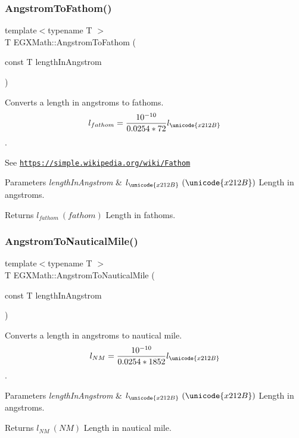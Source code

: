 \subsubsection{\texorpdfstring{Angstrom\+To\+Fathom()}{AngstromToFathom()}}
{\footnotesize\ttfamily template$<$typename T $>$ \\
T E\+G\+X\+Math\+::\+Angstrom\+To\+Fathom (\begin{DoxyParamCaption}\item[{const T}]{length\+In\+Angstrom }\end{DoxyParamCaption})}



Converts a length in angstroms to fathoms. \[ l_{fathom}= \frac{10^{-10}}{0.0254 * 72} l_{\unicode{x212B}} \]. 

See \href{https://simple.wikipedia.org/wiki/Fathom}{\tt https\+://simple.\+wikipedia.\+org/wiki/\+Fathom} 
\begin{DoxyParams}{Parameters}
{\em length\+In\+Angstrom} & $ l_{\unicode{x212B}}\ (\unicode{x212B})$ Length in angstroms. \\
\hline
\end{DoxyParams}
\begin{DoxyReturn}{Returns}
$ l_{fathom}\ (fathom)$ Length in fathoms. 
\end{DoxyReturn}
\mbox{\label{group___e_g_x_math-_conversions-_length_conversions-_non-_s_i-_angstrom-_nautical_ga4be465819cdcbfd7da046440844f5d82}} 
\subsubsection{\texorpdfstring{Angstrom\+To\+Nautical\+Mile()}{AngstromToNauticalMile()}}
{\footnotesize\ttfamily template$<$typename T $>$ \\
T E\+G\+X\+Math\+::\+Angstrom\+To\+Nautical\+Mile (\begin{DoxyParamCaption}\item[{const T}]{length\+In\+Angstrom }\end{DoxyParamCaption})}



Converts a length in angstroms to nautical mile. \[ l_{NM}= \frac{10^{-10}}{0.0254 * 1852} l_{\unicode{x212B}} \]. 


\begin{DoxyParams}{Parameters}
{\em length\+In\+Angstrom} & $ l_{\unicode{x212B}}\ (\unicode{x212B})$ Length in angstroms. \\
\hline
\end{DoxyParams}
\begin{DoxyReturn}{Returns}
$ l_{NM}\ (NM)$ Length in nautical mile. 
\end{DoxyReturn}
